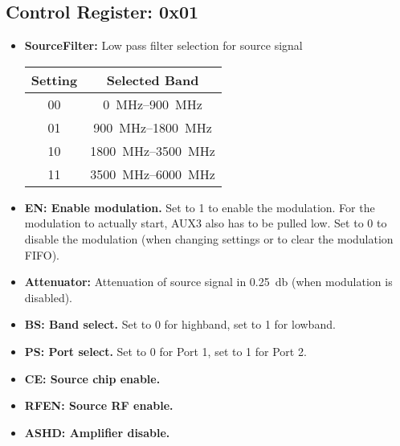 \documentclass{article}
\newcommand{\bitrect}[2]{
  \begin{pgfonlayer}{foreground}
    \draw [thick] (0,0) rectangle (#1,1);
    \pgfmathsetmacro\result{#1-1}
    \foreach \x in {1,...,\result}
      \draw [thick] (\x,1) -- (\x, 0.8);
  \end{pgfonlayer}
  \bitlabels{#1}{#2}
}
\newcommand{\rwbits}[3]{
  \draw [thick] (#1,0) rectangle ++(#2,1) node[pos=0.5]{#3};
  \pgfmathsetmacro\start{#1+0.5}
  \pgfmathsetmacro\finish{#1+#2-0.5}
}
\newcommand{\robits}[3]{
  \begin{pgfonlayer}{background}
    \draw [thick, fill=lightgray] (#1,0) rectangle ++(#2,1) node[pos=0.5]{#3};
  \end{pgfonlayer}
  \pgfmathsetmacro\start{#1+0.5}
  \pgfmathsetmacro\finish{#1+#2-0.5}
}
\newcommand{\bitlabels}[2]{
  \foreach \bit in {1,...,#1}{
     \pgfmathsetmacro\result{#2}
     \node [above] at (\bit-0.5, 1) {\pgfmathprintnumber{\result}};
   }
}
\begin{document}
\subsection{Control Register: 0x01}
\begin{center}
\end{center}
\begin{itemize}
\item \textbf{SourceFilter:} Low pass filter selection for source signal
\begin{center}
\begin{tabular}{ c|c }
Setting & Selected Band\\
 \hline
00 & \SIrange{0}{900}{\mega\hertz}\\
01 & \SIrange{900}{1800}{\mega\hertz}\\
10 & \SIrange{1800}{3500}{\mega\hertz}\\
11 & \SIrange{3500}{6000}{\mega\hertz}\\
\end{tabular}
\end{center}
\item \textbf{EN: Enable modulation.} Set to 1 to enable the modulation. For the modulation to actually start, AUX3 also has to be pulled low. Set to 0 to disable the modulation (when changing settings or to clear the modulation FIFO).
\item \textbf{Attenuator:} Attenuation of source signal in \SI{0.25}{\decibel} (when modulation is disabled).
\item \textbf{BS: Band select.} Set to 0 for highband, set to 1 for lowband.
\item \textbf{PS: Port select.} Set to 0 for Port 1, set to 1 for Port 2.
\item \textbf{CE: Source chip enable.} 
\item \textbf{RFEN: Source RF enable.}
\item \textbf{ASHD: Amplifier disable.}
\end{itemize}
\end{document}
